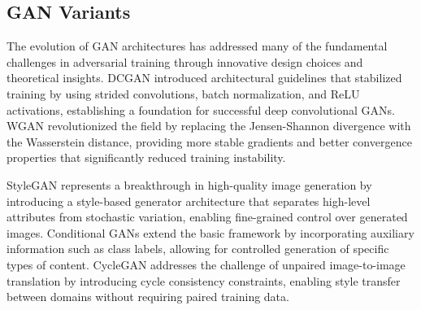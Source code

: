 \subsection{GAN Variants}

The evolution of GAN architectures has addressed many of the fundamental challenges in adversarial training through innovative design choices and theoretical insights. DCGAN introduced architectural guidelines that stabilized training by using strided convolutions, batch normalization, and ReLU activations, establishing a foundation for successful deep convolutional GANs. WGAN revolutionized the field by replacing the Jensen-Shannon divergence with the Wasserstein distance, providing more stable gradients and better convergence properties that significantly reduced training instability.

StyleGAN represents a breakthrough in high-quality image generation by introducing a style-based generator architecture that separates high-level attributes from stochastic variation, enabling fine-grained control over generated images. Conditional GANs extend the basic framework by incorporating auxiliary information such as class labels, allowing for controlled generation of specific types of content. CycleGAN addresses the challenge of unpaired image-to-image translation by introducing cycle consistency constraints, enabling style transfer between domains without requiring paired training data.





